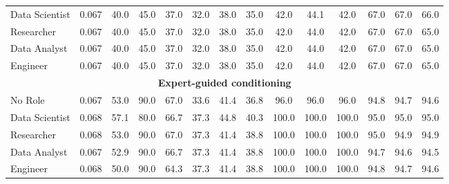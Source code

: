 \begin{table}[t]
\begin{tabular}{l|c|ccc|ccc|ccc|ccc}
Data Scientist & 0.067 & 40.0 & 45.0 & 37.0 
& 32.0 & 38.0 & 35.0 
& 42.0 & 44.1 & 42.0 
& 67.0 & 67.0 & 66.0 \\

Researcher     & 0.067 & 40.0 & 45.0 & 37.0
& 32.0 & 38.0 & 35.0 
& 42.0 & 44.0 & 42.0 
& 67.0 & 67.0 & 65.0 \\

Data Analyst   & 0.067 & 40.0 & 45.0 & 37.0
& 32.0 & 38.0 & 35.0 
& 42.0 & 44.0 & 42.0 
& 67.0 & 67.0 & 65.0 \\

Engineer       & 0.067 & 40.0 & 45.0 & 37.0
& 32.0 & 38.0 & 35.0 
& 42.0 & 44.0 & 42.0 
& 67.0 & 67.0 & 65.0 \\

\multicolumn{14}{c}{\cellcolor{gray!20}\textbf{Expert-guided conditioning}} \\
No Role        & 0.067 & 53.0 & 90.0 & 67.0 
& 33.6 & 41.4 & 36.8 
& 96.0 & 96.0 & 96.0 
& 94.8 & 94.7 & 94.6 \\

Data Scientist & 0.068 & 57.1 & 80.0 & 66.7 
& 37.3 & 44.8 & 40.3 
& 100.0 & 100.0 & 100.0 
& 95.0 & 95.0 & 95.0 \\

Researcher     & 0.068 & 53.0 & 90.0 & 67.0  
& 37.3 & 41.4 & 38.8 
& 100.0 & 100.0 & 100.0 
& 95.0 & 94.9 & 94.9 \\

Data Analyst   & 0.067 & 52.9 & 90.0 & 66.7 
& 37.3 & 41.4 & 38.8 
& 100.0 & 100.0 & 100.0 
& 94.7 & 94.6 & 94.5 \\

Engineer       & 0.068 & 50.0 & 90.0 & 64.3 
& 37.3 & 41.4 & 38.8 
& 100.0 & 100.0 & 100.0 
& 94.8 & 94.7 & 94.6 \\
\bottomrule
\end{tabular}
\end{table}